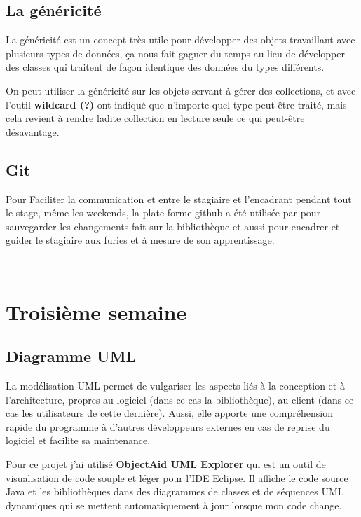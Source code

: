 \documentclass[12pt]{report}
\begin{document}
\subsection{La généricité}
La généricité est un concept très utile pour développer des objets travaillant avec plusieurs types de données, ça nous fait gagner du temps au lieu de développer des classes qui traitent de façon identique des données du types différents.\newline

On peut utiliser la généricité sur les objets servant à gérer des collections, et avec l'outil \textbf{wildcard (?)} ont indiqué que n'importe quel type peut être traité, mais cela revient à rendre ladite collection en lecture seule ce qui peut-être désavantage. 

\newpage
\subsection{Git}
Pour Faciliter la communication et entre le stagiaire et l'encadrant pendant tout le stage, même les weekends, la plate-forme github a été utilisée par pour sauvegarder les changements fait sur la bibliothèque et aussi pour encadrer et guider le stagiaire aux furies et à mesure de son apprentissage.

~\\
\section{Troisième semaine}

\subsection{Diagramme UML}

La modélisation UML permet de vulgariser les aspects liés à la conception et à l’architecture, propres au logiciel (dans ce cas la bibliothèque), au client (dans ce cas les utilisateurs de cette dernière). Aussi, elle apporte une compréhension rapide du programme à d’autres développeurs externes en cas de reprise du logiciel et facilite sa maintenance. \newline

Pour ce projet j'ai utilisé \textbf{ObjectAid UML Explorer} qui est un outil de visualisation de code souple et léger pour l'IDE Eclipse. Il affiche le code source Java et les bibliothèques dans des diagrammes de classes et de séquences UML dynamiques qui se mettent automatiquement à jour lorsque mon code change.\newline
\end{document}
